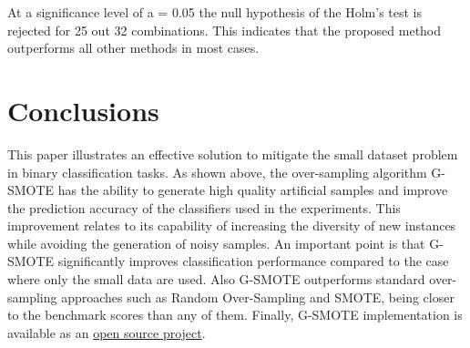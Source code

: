 \documentclass[parskip=full]{scrartcl}
\begin{document}
At a significance level of a = 0.05 the null hypothesis of the Holm's test is
rejected for 25 out 32 combinations. This indicates that the proposed method
outperforms all other methods in most cases.  

\section{Conclusions}

This paper illustrates an effective solution to mitigate the small dataset
problem in binary classification tasks. As shown above, the over-sampling
algorithm G-SMOTE has the ability to generate high quality artificial samples
and improve the prediction accuracy of the classifiers used in the experiments.
This improvement relates to its capability of increasing the diversity of new
instances while avoiding the generation of noisy samples. An important point is
that G-SMOTE significantly improves classification performance compared to the
case where only the small data are used. Also G-SMOTE outperforms standard
over-sampling approaches such as Random Over-Sampling and SMOTE, being closer to
the benchmark scores than any of them. Finally, G-SMOTE implementation is
available as an
\href{https://geometric-smote.readthedocs.io/en/latest/?badge=latest}{open
source project}.



\end{document}
